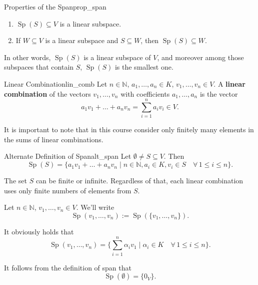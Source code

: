 \begin{lemma}{Properties of the Span}{prop_span}
	\begin{enumerate}
		\item[(1)] $\operatorname{Sp}(S) \subseteq V$ is a linear subspace.
		\item[(2)] If $W \subseteq V$ is a linear subspace and $S \subseteq W$, then $\operatorname{Sp}(S) \subseteq W$.
	\end{enumerate}
	In other words, $\operatorname{Sp}(S)$ is a linear subspace of $V$, and moreover among those subspaces that contain $S$, $\operatorname{Sp}(S)$ is the smallest one.
\end{lemma}

\begin{definition}{Linear Combination}{lin_comb}
	Let $n \in \mathbb{N}$, $a_1, \hdots , a_n \in K$, $v_1, \hdots , v_n \in V$. A \textbf{linear combination} of the vectors $v_1, \hdots , v_n$ with coefficients $a_1, \hdots , a_n$ is the vector
	\[
		a_1 v_1 + \hdots + a_n v_n = \sum_{i=1}^{n} a_i v_i \in V.
	\]
\end{definition}
It is important to note that in this course consider only finitely many elements in the sums of linear combinations.

\begin{lemma}{Alternate Definition of Span}{alt_span}
	Let $\emptyset \neq S \subseteq V$. Then
	\[
		\operatorname{Sp}(S) = \{a_1 v_1 + \hdots + a_n v_n \;|\; n \in \mathbb{N}, a_i \in K, v_i \in S \quad \forall\, 1 \leq i \leq n\}.
	\]
\end{lemma}

\begin{remark}
	The set $S$ can be finite or infinite. Regardless of that, each linear combination uses only finite numbers of elements from $S$.
\end{remark}

Let $n \in \mathbb{N}$, $v_1, \hdots , v_n \in V$. We'll write
\[
	\operatorname{Sp}(v_1, \hdots , v_n) := \operatorname{Sp}(\{v_1, \hdots , v_n\}).
\]

\begin{remark}
	It obviously holds that
	\[
		\operatorname{Sp}(v_1, \hdots , v_n) = \bigg\{\sum_{i=1}^{n}\alpha_i v_1 \;\bigg|\; \alpha_i \in K \quad \forall \, 1\leq i \leq n\bigg\}.
	\]
\end{remark}

\begin{remark}
	It follows from the definition of span that
	\[
		\operatorname{Sp}(\emptyset) = \{0_V\}.
	\]
\end{remark}

